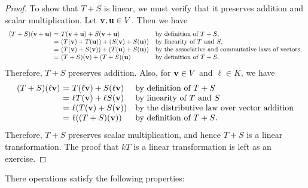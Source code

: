 \begin{proof}
  To show that $T+S$ is linear, we must verify that it preserves
  addition and scalar multiplication. Let $\mbox{\bf v},\mbox{\bf u}\in
  V$. Then we have
  \begin{equation*}
    \begin{array}{r@{~}c@{~}ll}
      (T+S)(\vect{v}+\vect{u})
      &=& T(\vect{v}+\vect{u}) + S(\vect{v}+\vect{u})
      & \mbox{by definition of $T+S$,} \\
      &=& (T(\vect{v}) + T(\vect{u})) + (S(\vect{v}) + S(\vect{u}))
      & \mbox{by linearity of $T$ and $S$,} \\
      &=& (T(\vect{v}) + S(\vect{v})) + (T(\vect{u}) + S(\vect{u}))
      & \mbox{by the associative and commutative laws of vectors,} \\
      &=& (T+S)(\vect{v}) + (T+S)(\vect{u})
      & \mbox{by definition of $T+S$.}
    \end{array}
  \end{equation*}
  Therefore, $T+S$ preserves addition. Also, for $\mbox{\bf v}\in V$ and
  $\ell\in K$, we have
  \begin{equation*}
    \begin{array}{r@{~}c@{~}ll}
      (T+S)(\ell\vect{v})
      &=& T(\ell\vect{v}) + S(\ell\vect{v})
      & \mbox{by definition of $T+S$} \\
      &=& \ell T(\vect{v}) + \ell S(\vect{v})
      & \mbox{by linearity of $T$ and $S$} \\
      &=& \ell(T(\vect{v}) + S(\vect{v}))
      & \mbox{by the distributive law over vector addition} \\
      &=& \ell((T+S)(\vect{v}))
      & \mbox{by definition of $T+S$.}
    \end{array}
  \end{equation*}
  Therefore, $T+S$ preserves scalar multiplication, and hence $T+S$ is
  a linear transformation. The proof that $kT$ is a linear
  transformation is left as an exercise.
\end{proof}

There operations satisfy the following properties:

